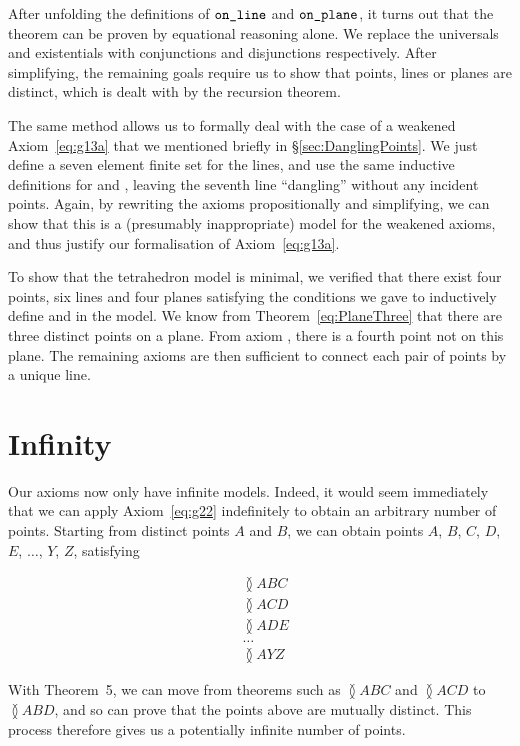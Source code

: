 After unfolding the definitions of $\texttt{on\_line}$ and $\texttt{on\_plane}$, it turns out that the theorem can be proven by equational reasoning alone. We replace the universals and existentials with conjunctions and disjunctions respectively. After simplifying, the remaining goals require us to show that points, lines or planes are distinct, which is dealt with by the recursion theorem.

The same method allows us to formally deal with the case of a weakened Axiom~\ref{eq:g13a} that we mentioned briefly in \S\ref{sec:DanglingPoints}. We just define a seven element finite set for the lines, and use the same inductive definitions for  and , leaving the seventh line ``dangling'' without any incident points. Again, by rewriting the axioms propositionally and simplifying, we can show that this is a (presumably inappropriate) model for the weakened axioms, and thus justify our formalisation of Axiom~\ref{eq:g13a}.

To show that the tetrahedron model is minimal, we verified that there exist four points, six lines and four planes satisfying the conditions we gave to inductively define  and  in the model. We know from Theorem~\ref{eq:PlaneThree} that there are three distinct points on a plane. From axiom , there is a fourth point not on this plane. The remaining axioms are then sufficient to connect each pair of points by a unique line.

\section{Infinity}\label{sec:Infinity}
Our axioms now only have infinite models. Indeed, it would seem immediately that we can apply Axiom~\ref{eq:g22} indefinitely to obtain an arbitrary number of points. Starting from distinct points $A$ and $B$, we can obtain points $A$, $B$, $C$, $D$, $E$, $\ldots$, $Y$, $Z$, satisfying 

\begin{align*}
&\between{A}{B}{C}\\
&\between{A}{C}{D}\\
&\between{A}{D}{E}\\
&\ldots\\
&\between{A}{Y}{Z}
\end{align*}

With Theorem~5, we can move from theorems such as $\between{A}{B}{C}$ and $\between{A}{C}{D}$ to $\between{A}{B}{D}$, and so can prove that the points above are mutually distinct. This process therefore gives us a potentially infinite number of points.

